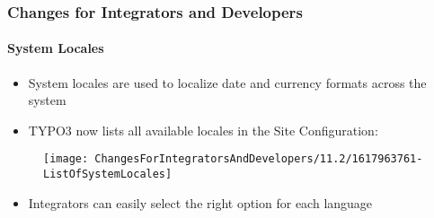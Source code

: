 %

\begin{frame}[fragile]
	\frametitle{Changes for Integrators and Developers}
	\framesubtitle{System Locales}

	\begin{itemize}
		\item System locales are used to localize date and currency formats across the system
		\item TYPO3 now lists all available locales in the Site Configuration:
	\end{itemize}

	\begin{figure}
		\texttt{[image: ChangesForIntegratorsAndDevelopers/11.2/1617963761-ListOfSystemLocales]}
	\end{figure}

	\begin{itemize}
		\item Integrators can easily select the right option for each language
	\end{itemize}

\end{frame}

